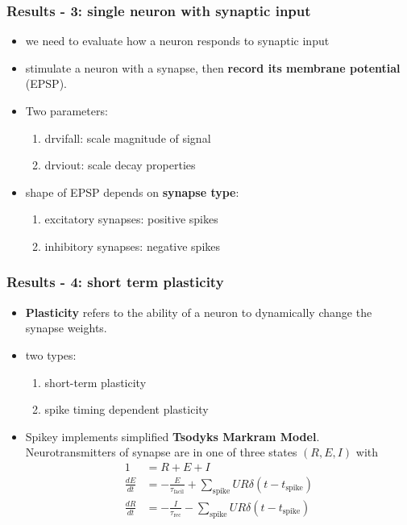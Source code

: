 \documentclass{beamer}
\begin{document}
\begin{frame}
    \frametitle{Results - 3: single neuron with synaptic input} 
    \begin{itemize}
    		\item we need to evaluate how a neuron responds to synaptic input
    		\item stimulate a neuron with a synapse,  then \textbf{record its membrane 
    		potential} (EPSP).
    		\item Two parameters:
    		\begin{enumerate}
    			\item drvifall: scale magnitude of signal
    			\item drviout: scale decay properties 
		\end{enumerate}  
		\item shape of EPSP depends on \textbf{synapse type}:
		\begin{enumerate}
			\item excitatory synapses: positive spikes
			\item inhibitory synapses: negative spikes
		\end{enumerate}		  		    
    \end{itemize}
\end{frame}

\begin{frame}
    \frametitle{Results - 4: short term plasticity} 
    \begin{itemize}
    		\item \textbf{Plasticity} refers to the ability of a neuron to dynamically 
    		change the synapse weights.
    		\item two types:
    		\begin{enumerate}
    			\item short-term plasticity
    			\item spike timing dependent plasticity
    		\end{enumerate}
    		\item Spikey implements simplified \textbf{Tsodyks Markram Model}.  
    		Neurotransmitters of synapse are in one of three states $(R,E,I)$ with
    		\begin{align}
			1 &= R + E + I  \\
			\frac{dE}{dt} &= - \frac{E}{\tau_\text{facil}} + \sum_\text{spike} 
			UR\delta(t-t_\text{spike} ) \\
			\frac{dR}{dt} &= - \frac{I}{\tau_\text{rec}} - \sum_\text{spike} 
			UR\delta(t-t_\text{spike} ) 
\end{align}
    \end{itemize}
\end{frame}
\end{document}
